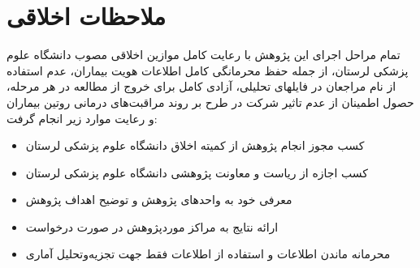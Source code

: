 \section{ملاحظات اخلاقی}
\label{sec:ethics}


تمام مراحل اجرای این پژوهش با رعایت کامل موازین اخلاقی مصوب دانشگاه علوم پزشکی لرستان، از جمله حفظ محرمانگی کامل اطلاعات هویت بیماران، عدم استفاده از نام مراجعان در فایلهای تحلیلی، آزادی کامل برای خروج از مطالعه در هر مرحله، حصول اطمینان از عدم تاثیر شرکت در طرح بر روند مراقبت‌های درمانی روتین بیماران و رعایت موارد زیر انجام گرفت:

\begin{itemize}
\item كسب مجوز انجام پژوهش از کمیته اخلاق دانشگاه علوم پزشکی لرستان
\item کسب اجازه از ریاست و معاونت پژوهشی دانشگاه علوم پزشکی لرستان
\item معرفی خود به واحدهای پژوهش و توضیح اهداف پژوهش
\item ارائه نتایج به مراکز موردپژوهش در صورت درخواست
\item محرمانه ماندن اطلاعات و استفاده از اطلاعات فقط جهت تجزیه‌وتحلیل آماری
\end{itemize}
